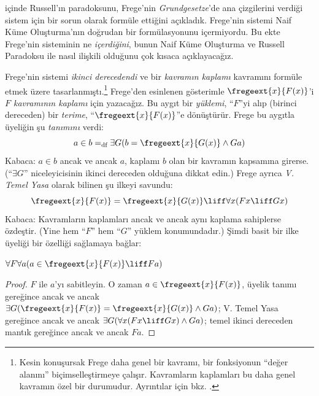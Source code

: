 



 içinde Russell'ın paradoksunu, Frege'nin
\emph{Grundgesetze}'de ana çizgilerini verdiği sistem için bir sorun olarak
formüle ettiğini açıkladık. Frege'nin sistemi Naif Küme Oluşturma'nın doğrudan
bir formülasyonunu içermiyordu. Bu ekte Frege'nin sisteminin ne
\emph{içerdiğini}, bunun Naif Küme Oluşturma ve Russell Paradoksu ile nasıl
ilişkili olduğunu çok kısaca açıklayacağız.

Frege'nin sistemi \emph{ikinci derecedendi} ve bir \emph{kavramın kaplamı}
kavramını formüle etmek üzere tasarlanmıştı.\footnote{Kesin konuşursak Frege
  daha genel bir kavramı, bir fonksiyonun ``değer alanını''
  biçimselleştirmeye çalışır. Kavramların kaplamları bu daha genel kavramın
  özel bir durumudur. Ayrıntılar için bkz.
  \citet[pp.\ 8--9]{Heck2012}.} Frege'den esinlenen gösterimle
$\fregeext{x}{F(x)}$'i \emph{$F$ kavramının kaplamı} için yazacağız. Bu
aygıt bir \emph{yüklemi}, ``$F$''yi alıp (birinci dereceden) bir
\emph{terime}, ``$\fregeext{x}{F(x)}$''e dönüştürür. Frege bu aygıtla
üyeliğin şu \emph{tanımını} verdi:
\[
  a \in b =_\text{df} \exists G(b = \fregeext{x}{G(x)} \land Ga)
\]
Kabaca: $a\in b$ ancak ve ancak $a$, kaplamı $b$ olan bir kavramın kapsamına
girerse. (``$\exists G$'' niceleyicisinin ikinci dereceden olduğuna dikkat
edin.) Frege ayrıca \emph{V. Temel Yasa} olarak bilinen şu ilkeyi savundu:
$$\fregeext{x}{F(x)} = \fregeext{x}{G(x)} \liff \forall x (Fx \liff Gx)$$
Kabaca: Kavramların kaplamları ancak ve ancak aynı kaplama sahiplerse
özdeştir. (Yine hem ``$F$'' hem ``$G$'' yüklem konumundadır.) Şimdi basit bir
ilke üyeliği bir özelliği sağlamaya bağlar:

\begin{lem}
$\forall F \forall a(a \in \fregeext{x}{F(x)} \liff Fa)$
\end{lem}

\begin{proof}
$F$ ile $a$'yı sabitleyin. O zaman $a\in\fregeext{x}{F(x)}$, üyelik tanımı
gereğince ancak ve ancak
$\exists G(\fregeext{x}{F(x)}=\fregeext{x}{G(x)}\land Ga)$; V. Temel Yasa
gereğince ancak ve ancak $\exists G(\forall x(Fx\liff Gx)\land Ga)$; temel
ikinci dereceden mantık gereğince ancak ve ancak $Fa$.
\end{proof}

